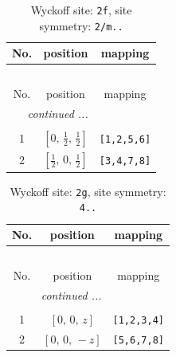 \documentclass[fleqn,8pt]{jsarticle}
\begin{document}
\renewcommand{\arraystretch}{1.2}
\begin{longtable}{ccc}
\caption{Wyckoff site: {\tt 2f}, site symmetry: {\tt 2/m..}}
 \\
 \hline \hline
No. & position & mapping \\ \hline \endfirsthead

\multicolumn{2}{l}{\tablename\ \thetable{}} \\
 \hline \hline
No. & position & mapping \\ \hline \endhead

 \hline \hline
\multicolumn{2}{r}{\footnotesize\it continued ...} \\ \endfoot

 \hline \hline
\multicolumn{2}{r}{} \\ \endlastfoot

1 & $\left[ 0,\, \frac{1}{2},\, \frac{1}{2} \right]$ & {\tt [1,2,5,6]} \\ \hline
2 & $\left[ \frac{1}{2},\, 0,\, \frac{1}{2} \right]$ & {\tt [3,4,7,8]} \\
\end{longtable}
\renewcommand{\arraystretch}{1.2}
\begin{longtable}{ccc}
\caption{Wyckoff site: {\tt 2g}, site symmetry: {\tt 4..}}
 \\
 \hline \hline
No. & position & mapping \\ \hline \endfirsthead

\multicolumn{2}{l}{\tablename\ \thetable{}} \\
 \hline \hline
No. & position & mapping \\ \hline \endhead

 \hline \hline
\multicolumn{2}{r}{\footnotesize\it continued ...} \\ \endfoot

 \hline \hline
\multicolumn{2}{r}{} \\ \endlastfoot

1 & $\left[ 0,\, 0,\, z \right]$ & {\tt [1,2,3,4]} \\ \hline
2 & $\left[ 0,\, 0,\, - z \right]$ & {\tt [5,6,7,8]} \\
\end{longtable}
\renewcommand{\arraystretch}{1.2}
\end{document}
